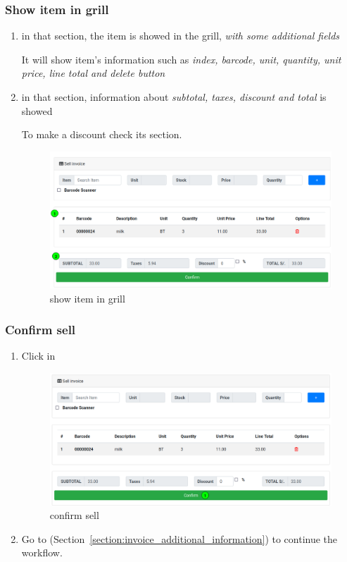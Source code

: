 \documentclass[a4paper,11pt]{refart}
\begin{document}
\subsubsection{Show item in grill}
\begin{enumerate}
	\item in that section, the item is showed in the grill,  \emph{with some additional fields}
	\medskip
	\begin{leftbar}
		It will show item's information such as \emph{ index, barcode, unit, quantity, unit price, line total and delete button}
	\end{leftbar}
	\item in that section, information about \emph{subtotal, taxes, discount and total} is showed
	\medskip
	\begin{leftbar}
	To make a discount check its section.
	\end{leftbar}
	\begin{figure}[H]\centering
		\includegraphics[width=\textwidth]{images/invoice_sell-grill}
		\caption{show item in grill}\label{fig:invoice_sell-grill}
	\end{figure}
\end{enumerate}

\subsubsection{Confirm sell}
\begin{enumerate}
	\item Click in  
	\begin{figure}[H]\centering
		\includegraphics[width=\textwidth]{images/invoice_sell-confirm}
		\caption{confirm sell}\label{fig:invoice_sell-confirm}
	\end{figure}
	\item Go to (Section~\ref{section:invoice_additional_information}) to continue the workflow.
\end{enumerate}
\end{document}
